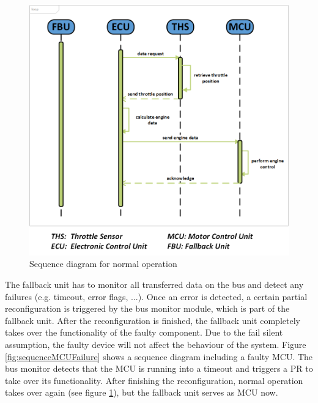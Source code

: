 \begin{figure}[h!]
    \centering
    \includegraphics[width=\textwidth]{figures/sequence_normal_op.png}
    \caption{Sequence diagram for normal operation}\label{fig:sequenceNormalOp}
\end{figure}

The fallback unit has to monitor all transferred data on the bus and detect any failures (e.g. timeout, error flags, ...). 
Once an error is detected, a certain partial reconfiguration is triggered by the bus monitor module, which is part of the fallback unit. 
After the reconfiguration is finished, the fallback unit completely takes over the functionality of the faulty component. 
Due to the fail silent assumption, the faulty device will not affect the behaviour of the system. 
Figure \ref{fig:sequenceMCUFailure} shows a sequence diagram including a faulty \gls{MCU}. 
The bus monitor detects that the \gls{MCU} is running into a timeout and triggers a \gls{PR} to take over its functionality. 
After finishing the reconfiguration, normal operation takes over again (see figure \ref{fig:sequenceNormalOp}), but the fallback unit serves as \gls{MCU} now.

